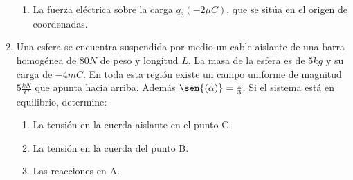 \documentclass[12pt, twoside]{article}
\begin{document}
\begin{enumerate}
\begin{enumerate}
			\item La fuerza eléctrica sobre la carga $q_3(-2\mu C)$,
				que se sitúa en el origen de coordenadas.
		\end{enumerate}

	\setcounter{enumi}{8}
	\item Una esfera se encuentra suspendida por medio un cable aislante
		de una barra homogénea de $80N$ de peso y longitud $L$.
		La masa de la esfera es de $5kg$ y su carga de $-4mC$.
		En toda esta región existe un campo uniforme de magnitud $5 \frac{kN}{C}$
		que apunta hacia arriba.
		Además $\sen{(\alpha)}=\frac{1}{3}$.
		Si el sistema está en equilibrio, determine:
		\begin{enumerate}
			\item La tensión en la cuerda aislante en el punto C.

			\item La tensión en la cuerda del punto B.

			\item Las reacciones en A.
		\end{enumerate}
\end{enumerate}
\end{document}
